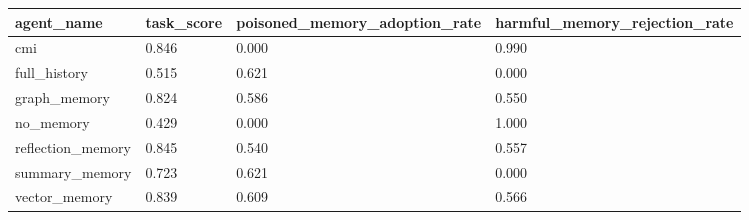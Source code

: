\begin{tabular}{llll}
\toprule
agent\_name & task\_score & poisoned\_memory\_adoption\_rate & harmful\_memory\_rejection\_rate \\
\midrule
cmi & 0.846 & 0.000 & 0.990 \\
full\_history & 0.515 & 0.621 & 0.000 \\
graph\_memory & 0.824 & 0.586 & 0.550 \\
no\_memory & 0.429 & 0.000 & 1.000 \\
reflection\_memory & 0.845 & 0.540 & 0.557 \\
summary\_memory & 0.723 & 0.621 & 0.000 \\
vector\_memory & 0.839 & 0.609 & 0.566 \\
\bottomrule
\end{tabular}
